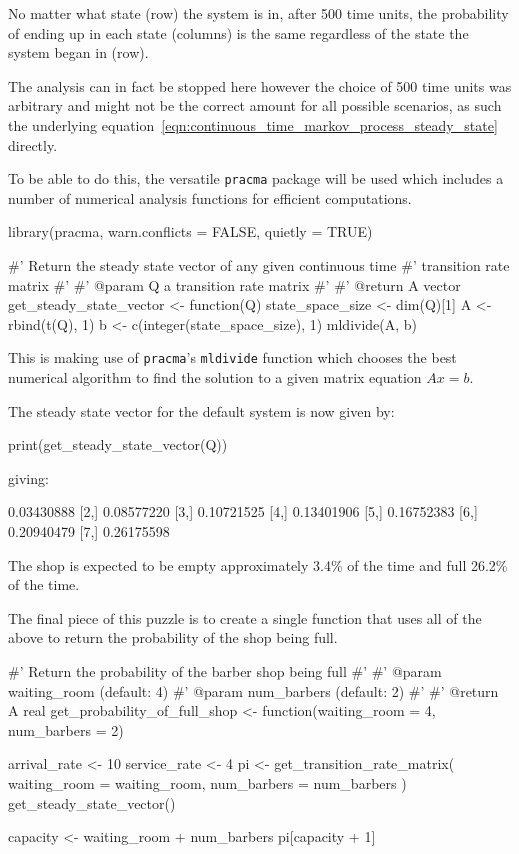 No matter what state (row) the system is in,
after 500 time units, the probability of ending up in each state (columns) is
the same regardless of the state the system began in (row).

The analysis can in fact be stopped here
however the choice of 500 time units was arbitrary and might not be the correct
amount for all possible scenarios, as such the
underlying equation~\ref{eqn:continuous_time_markov_process_steady_state}
directly.

To be able to do this, the versatile \texttt{pracma} package will be used
which includes a number of numerical analysis functions for efficient
computations.

\begin{Rin}
library(pracma, warn.conflicts = FALSE, quietly = TRUE)

#' Return the steady state vector of any given continuous time
#' transition rate matrix
#'
#' @param Q a transition rate matrix
#'
#' @return A vector
get_steady_state_vector <- function(Q){
  state_space_size <- dim(Q)[1]
  A <- rbind(t(Q), 1)
  b <- c(integer(state_space_size), 1)
  mldivide(A, b)
}
\end{Rin}

This is making use of \texttt{pracma}'s \texttt{mldivide} function
which chooses the best numerical algorithm to find the solution to a given
matrix equation \(Ax=b\).

The steady state vector for the default system is now given by:

\begin{Rin}
print(get_steady_state_vector(Q))
\end{Rin}

giving:

\begin{Rout}
           [,1]
[1,] 0.03430888
[2,] 0.08577220
[3,] 0.10721525
[4,] 0.13401906
[5,] 0.16752383
[6,] 0.20940479
[7,] 0.26175598
\end{Rout}

The shop is expected to be empty approximately 3.4\% of the time
and full 26.2\% of the time.

The final piece of this puzzle is to create a single function that uses all of
the above to return the probability of the shop being full.

\begin{Rin}
#' Return the probability of the barber shop being full
#'
#' @param waiting_room (default: 4)
#' @param num_barbers (default: 2)
#'
#' @return A real
get_probability_of_full_shop <- function(waiting_room = 4,
                                         num_barbers = 2){
  arrival_rate <- 10
  service_rate <- 4
  pi <- get_transition_rate_matrix(
    waiting_room = waiting_room,
    num_barbers = num_barbers
    ) %
    get_steady_state_vector()

  capacity <- waiting_room + num_barbers
  pi[capacity + 1]
}
\end{Rin}

